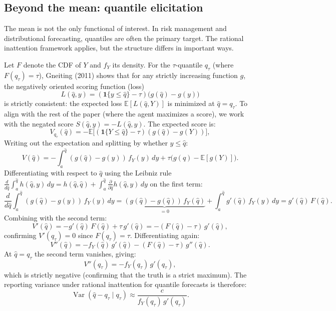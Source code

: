 \documentclass[11pt]{article}
\begin{document}
\subsection{Beyond the mean: quantile elicitation}\label{sec:quantile}

The mean is not the only functional of interest. In risk management and distributional forecasting, quantiles are often the primary target. The rational inattention framework applies, but the structure differs in important ways.

Let $F$ denote the CDF of $Y$ and $f_Y$ its density. For the $\tau$-quantile $q_\tau$ (where $F(q_\tau) = \tau$), Gneiting (2011) shows that for any strictly increasing function $g$, the negatively oriented scoring function (loss)
\[
L(\hat{q}, y) = (\mathbf{1}\{y \leq \hat{q}\} - \tau)\big(g(\hat{q}) - g(y)\big)
\]
is strictly consistent: the expected loss $\mathbb{E}[L(\hat{q}, Y)]$ is minimized at $\hat{q} = q_\tau$. To align with the rest of the paper (where the agent maximizes a score), we work with the negated score $S(\hat{q}, y) = -L(\hat{q}, y)$. The expected score is:
\[
V_{q_\tau}(\hat{q}) = -\mathbb{E}\big[(\mathbf{1}\{Y \leq \hat{q}\} - \tau)(g(\hat{q}) - g(Y))\big],
\]
Writing out the expectation and splitting by whether $y \leq \hat{q}$:
\[
V(\hat{q}) = -\int_a^{\hat{q}} (g(\hat{q}) - g(y))\,f_Y(y)\,dy + \tau\big(g(\hat{q}) - \mathbb{E}[g(Y)]\big).
\]
Differentiating with respect to $\hat{q}$ using the Leibniz rule $\frac{d}{d\hat{q}} \int_a^{\hat{q}} h(\hat{q}, y)\,dy = h(\hat{q}, \hat{q}) + \int_a^{\hat{q}} \frac{\partial}{\partial \hat{q}} h(\hat{q}, y)\,dy$ on the first term:
\[
\frac{d}{d\hat{q}} \int_a^{\hat{q}} (g(\hat{q}) - g(y))\,f_Y(y)\,dy = \underbrace{(g(\hat{q}) - g(\hat{q}))\,f_Y(\hat{q})}_{= 0} + \int_a^{\hat{q}} g'(\hat{q})\,f_Y(y)\,dy = g'(\hat{q})\,F(\hat{q}).
\]
Combining with the second term:
\[
V'(\hat{q}) = -g'(\hat{q})\,F(\hat{q}) + \tau\,g'(\hat{q}) = -(F(\hat{q}) - \tau)\,g'(\hat{q}),
\]
confirming $V'(q_\tau) = 0$ since $F(q_\tau) = \tau$. Differentiating again:
\[
V''(\hat{q}) = -f_Y(\hat{q})\,g'(\hat{q}) - (F(\hat{q}) - \tau)\,g''(\hat{q}).
\]
At $\hat{q} = q_\tau$ the second term vanishes, giving:
\begin{equation}\label{eq:quantile-curvature}
V''(q_\tau) = -f_Y(q_\tau)\,g'(q_\tau),
\end{equation}
which is strictly negative (confirming that the truth is a strict maximum). The reporting variance under rational inattention for quantile forecasts is therefore:
\begin{equation}\label{eq:quantile-variance}
\operatorname{Var}(\hat{q} - q_\tau \mid q_\tau) \approx \frac{c}{f_Y(q_\tau)\,g'(q_\tau)}.
\end{equation}
\end{document}
